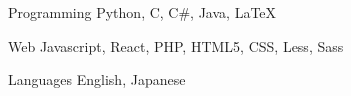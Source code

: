 

\begin{cvskills}

  \cvskill
    {Programming} %
    {Python, C, C\#, Java, LaTeX} %

  \cvskill
    {Web} %
    {Javascript, React, PHP, HTML5, CSS, Less, Sass} %

  \cvskill
    {Languages} %
    {English, Japanese} %

\end{cvskills}
